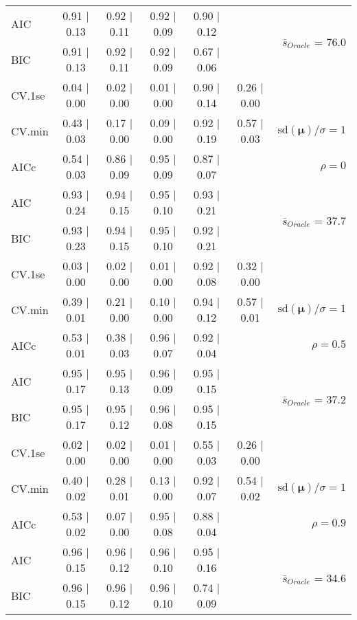 \begin{table}
\begin{center}
\begin{tabular}{l*{5}{c}|r}
AIC & 0.91 $\mid$ 0.13 & 0.92 $\mid$ 0.11 & 0.92 $\mid$ 0.09 & 0.90 $\mid$ 0.12 & &  \multirow{2}{*}{$\bar{s}_{Oracle}$ = 76.0} \\
BIC & 0.91 $\mid$ 0.13 & 0.92 $\mid$ 0.11 & 0.92 $\mid$ 0.09 & 0.67 $\mid$ 0.06 & &  \\
 \hline 
CV.1se & 0.04 $\mid$ 0.00 & 0.02 $\mid$ 0.00 & 0.01 $\mid$ 0.00 & 0.90 $\mid$ 0.14 & 0.26 $\mid$ 0.00 & \\
CV.min & 0.43 $\mid$ 0.03 & 0.17 $\mid$ 0.00 & 0.09 $\mid$ 0.00 & 0.92 $\mid$ 0.19 & 0.57 $\mid$ 0.03 &  $\mathrm{sd}(\mathbf{\mu})/\sigma=1$ \\
AICc & 0.54 $\mid$ 0.03 & 0.86 $\mid$ 0.09 & 0.95 $\mid$ 0.09 & 0.87 $\mid$ 0.07 & & $\rho=0$ \\
AIC & 0.93 $\mid$ 0.24 & 0.94 $\mid$ 0.15 & 0.95 $\mid$ 0.10 & 0.93 $\mid$ 0.21 & &  \multirow{2}{*}{$\bar{s}_{Oracle}$ = 37.7} \\
BIC & 0.93 $\mid$ 0.23 & 0.94 $\mid$ 0.15 & 0.95 $\mid$ 0.10 & 0.92 $\mid$ 0.21 & &  \\
 \hline 
CV.1se & 0.03 $\mid$ 0.00 & 0.02 $\mid$ 0.00 & 0.01 $\mid$ 0.00 & 0.92 $\mid$ 0.08 & 0.32 $\mid$ 0.00 & \\
CV.min & 0.39 $\mid$ 0.01 & 0.21 $\mid$ 0.00 & 0.10 $\mid$ 0.00 & 0.94 $\mid$ 0.12 & 0.57 $\mid$ 0.01 &  $\mathrm{sd}(\mathbf{\mu})/\sigma=1$ \\
AICc & 0.53 $\mid$ 0.01 & 0.38 $\mid$ 0.03 & 0.96 $\mid$ 0.07 & 0.92 $\mid$ 0.04 & & $\rho=0.5$ \\
AIC & 0.95 $\mid$ 0.17 & 0.95 $\mid$ 0.13 & 0.96 $\mid$ 0.09 & 0.95 $\mid$ 0.15 & &  \multirow{2}{*}{$\bar{s}_{Oracle}$ = 37.2} \\
BIC & 0.95 $\mid$ 0.17 & 0.95 $\mid$ 0.12 & 0.96 $\mid$ 0.08 & 0.95 $\mid$ 0.15 & &  \\
 \hline 
CV.1se & 0.02 $\mid$ 0.00 & 0.02 $\mid$ 0.00 & 0.01 $\mid$ 0.00 & 0.55 $\mid$ 0.03 & 0.26 $\mid$ 0.00 & \\
CV.min & 0.40 $\mid$ 0.02 & 0.28 $\mid$ 0.01 & 0.13 $\mid$ 0.00 & 0.92 $\mid$ 0.07 & 0.54 $\mid$ 0.02 &  $\mathrm{sd}(\mathbf{\mu})/\sigma=1$ \\
AICc & 0.53 $\mid$ 0.02 & 0.07 $\mid$ 0.00 & 0.95 $\mid$ 0.08 & 0.88 $\mid$ 0.04 & & $\rho=0.9$ \\
AIC & 0.96 $\mid$ 0.15 & 0.96 $\mid$ 0.12 & 0.96 $\mid$ 0.10 & 0.95 $\mid$ 0.16 & &  \multirow{2}{*}{$\bar{s}_{Oracle}$ = 34.6} \\
BIC & 0.96 $\mid$ 0.15 & 0.96 $\mid$ 0.12 & 0.96 $\mid$ 0.10 & 0.74 $\mid$ 0.09 & &  \\

\end{tabular}
\end{center}
\end{table}
